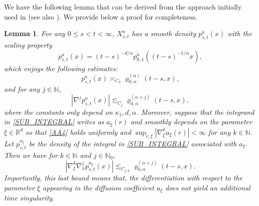 \documentclass[JEP,XML,SOM,Unicode,published]{cedram}
\theoremstyle{plain}
\newtheorem{lemma}[theorem]{Lemma}
\theoremstyle{definition}
\newcommand\mN{\mathbb{N}}
\newcommand\mR{\mathbb{R}}
\newcommand\1{{\mathbf{1}}}
\begin{document}
We have the following lemma that can be derived from the approach initially used in \cite{Be} (see also
\cite{Bo-Ja}).
We provide below a proof for completeness.
\begin{lemma}\label{Le27}
For any $0\leq s<t<\infty$, $X^a_{s,t}$ has a smooth density $p_{s,t}^{a}(x)$ with the scaling property
\begin{equation}\label{SC0}
p_{s,t}^{a}(x)=(t-s)^{-d/\alpha} p_{0,1}^{\tilde a}((t-s)^{-1/\alpha}x),
\end{equation}
which enjoys the following estimates:
\begin{equation}
p_{s,t}^{a}(x)\asymp_{C_0}\varrho^{(\alpha)}_{0,\alpha}(t-s,x),\label{Es0}
\end{equation}
and for any $j\in\mN$,
\begin{equation}
|\nabla^j p_{s,t}^{a}(x)|\lesssim_{C_j}\varrho^{(\alpha+j)}_{0,\alpha}(t-s,x),\label{Es2}
\end{equation}
where the constants only depend on $\kappa_1,d,\alpha$. Moreover, suppose that the integrand in \eqref{SUB_INTEGRAL} writes as $a_\xi(r)$ and smoothly depends on the parameter $\xi\in\mR^d$ so that \eqref{AA4} holds uniformly and
$\sup_{r,\xi}|\nabla^k_\xi a_\xi(r)|<\infty$ for any $k\in\mN$.
Let $p_{s,t}^{a_\xi}$ be the density of the integral in \eqref{SUB_INTEGRAL} associated with $a_\xi$. Then we have
for $k\in\mN$ and $j\in\mN_0$,
\begin{equation}
|\nabla^k_\xi\nabla^j_x p_{s,t}^{a_\xi}(x)|\lesssim_{C_{j,k}} \varrho^{(\alpha+j)}_{0,\alpha}(t-s,x).\label{Es22}
\end{equation}
Importantly, this last bound means that, the differentiation with respect to the parameter $\xi $ appearing in the \textit{diffusion} coefficient $a_\xi$ does not yield an additional time singularity.
\end{lemma}
\end{document}
